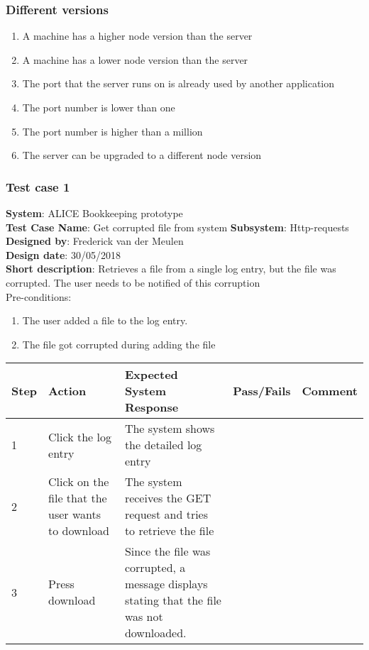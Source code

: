 \subsubsection{Different versions}
\begin{enumerate}
\item A machine has a higher node version than the server
\item A machine has a lower node version than the server
\item The port that the server runs on is already used by another application
\item The port number is lower than one
\item The port number is higher than a million
\item The server can be upgraded to a different node version
\end{enumerate}

\subsubsection{Test case 1}
\textbf{System}:  ALICE Bookkeeping prototype \\
\textbf{Test Case Name}:  Get corrupted file from system
\textbf{Subsystem}:  Http-requests
\textbf{Designed by}:  Frederick van der Meulen\\
\textbf{Design date}: 30/05/2018 \\
\textbf{Short description}: Retrieves a file from a single log entry, but the file was corrupted. The user needs to be notified of this corruption \\

Pre-conditions: \\
\begin{enumerate}
\item The user added a file to the log entry.
\item The file got corrupted during adding the file
\end{enumerate}

\begin{longtable}{ | p{0.8cm} | p{4.5cm} | p{6cm} | p{1.5cm} | p{1.5cm} |}
\hline
Step & Action & Expected System Response & Pass/Fails & Comment \\ \hline
1 & Click the log entry & The system shows the detailed log entry & & \\ \hline
2 & Click on the file that the user wants to download & The system receives the GET request and tries to retrieve the file & & \\ \hline
3 & Press download & Since the file was corrupted, a message displays stating that the file was not downloaded. & & \\ \hline
\end{longtable}


